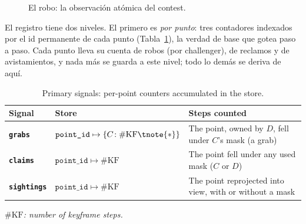 \begin{figure}[ht]
  \centering
  \caption{El robo: la observación atómica del contest.}
  \label{fig:contest_grab}
\end{figure}

El registro tiene dos niveles. El primero es \emph{por punto}: tres contadores indexados por
el id permanente de cada punto (Tabla~\ref{tab:contest_primary}), la verdad de base que gotea
paso a paso. Cada punto lleva su cuenta de robos (por challenger), de reclamos y de
avistamientos, y nada más se guarda a este nivel; todo lo demás se deriva de aquí.

\begin{table}[ht]
  \centering
  \small
  \begin{threeparttable}
  \renewcommand{\arraystretch}{1.5}
  \begin{tabular}{@{}l l p{7.4cm}@{}}
    \toprule
    \textbf{Signal} & \textbf{Store} & \textbf{Steps counted} \\
    \midrule
    \textbf{\texttt{grabs}}     & $\texttt{point\_id}\mapsto\{C\!:\#\mathrm{KF}\tnote{*}\}$ &
      The point, owned by $D$, fell under $C$'s mask (a grab) \\
    \textbf{\texttt{claims}}    & $\texttt{point\_id}\mapsto\#\mathrm{KF}$ &
      The point fell under any used mask ($C$ or $D$) \\
    \textbf{\texttt{sightings}} & $\texttt{point\_id}\mapsto\#\mathrm{KF}$ &
      The point reprojected into view, with or without a mask \\
    \bottomrule
  \end{tabular}
  \begin{tablenotes}
    \footnotesize\item[*]\itshape $\#\mathrm{KF}$: number of
      \foreignlanguage{english}{keyframe} steps.
  \end{tablenotes}
  \end{threeparttable}
  \caption{Primary signals: per-point counters accumulated in the store.}
  \label{tab:contest_primary}
\end{table}

